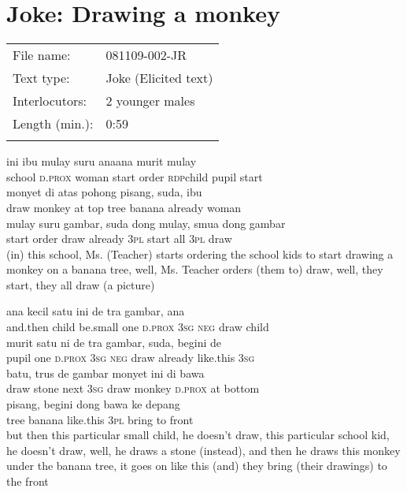 \section{Joke: Drawing a monkey}
\label{Para_B.11}
\begin{tabular}{ll}
\lsptoprule
File name: &  081109-002-JR\\
Text type: &  Joke (Elicited text)\\
Interlocutors: &  2 younger males\\
Length (min.): &  0:59\\
\lspbottomrule
\end{tabular}
\setcounter{equation}{0}
\ea
{}    {ini}    {ibu}    {mulay}    {suru}    {ana{\Tilde}ana}    {murit}    {mulay}\\
   {school}    {\textsc{d.prox}}    {woman}    {start}    {order}    {\textsc{rdp}{\Tilde}child}    {pupil}    {start}\\
    {monyet}   di    {atas}    {pohong}    {pisang,}    {suda,}    {ibu}\\
   {draw}    {monkey}   at    {top}    {tree}    {banana}    {already}    {woman}\\
\gll mulay    {suru}    {gambar,}    {suda}    {dong}    {mulay,}    {smua}    {dong}   gambar\\
  start    {order}    {draw}    {already}    {\textsc{3pl}}    {start}    {all}    {\textsc{3pl}}   draw\\
\glt
(in) this school, Ms. (Teacher) starts ordering the school kids to start drawing a monkey on a banana tree, well, Ms. Teacher orders (them to) draw, well, they start, they all draw (a picture)
\z

\ea
{}    {ana}    {kecil}    {satu}    {ini}    {de}    {tra}    {gambar,}   ana\\
   {and.then}    {child}    {be.small}    {one}    {\textsc{d.prox}}    {\textsc{3sg}}    {\textsc{neg}}    {draw}   child\\
\gll murit    {satu}    {ni}    {de}    {tra}    {gambar,}    {suda,}    {begini}    {de}\\
  pupil    {one}    {\textsc{d.prox}}    {\textsc{3sg}}    {\textsc{neg}}    {draw}    {already}    {like.this}    {\textsc{3sg}}\\
    {batu,}    {trus}    {de}    {gambar}    {monyet}    {ini}   di    {bawa}\\
   {draw}    {stone}    {next}    {\textsc{3sg}}    {draw}    {monkey}    {\textsc{d.prox}}   at    {bottom}\\
    {pisang,}    {begini}    {dong}    {bawa}    {ke}    {depang}\\
   {tree}    {banana}    {like.this}    {\textsc{3pl}}    {bring}    {to}    {front}\\
\glt
but then this particular small child, he doesn’t draw, this particular school kid, he doesn’t draw, well, he draws a stone (instead), and then he draws this monkey under the banana tree, it goes on like this (and) they bring (their drawings) to the front
\z

